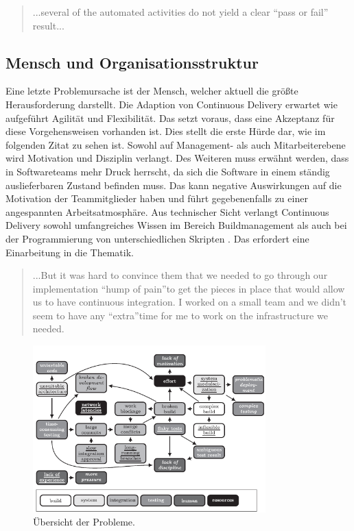 \begin{quote}\glqq ...several of the automated activities do not yield a clear “pass or fail” result... \grqq~\cite[S.65]{Laukkanen.2017}\end{quote}
%

\subsection{Mensch und Organisationsstruktur}
Eine letzte Problemursache ist der Mensch, welcher aktuell die größte Herausforderung darstellt. Die Adaption von Continuous Delivery erwartet wie aufgeführt Agilität und Flexibilität. Das setzt voraus, dass eine Akzeptanz für diese Vorgehensweisen vorhanden ist. Dies stellt die erste Hürde dar, wie im folgenden Zitat zu sehen ist. Sowohl auf Management- als auch Mitarbeiterebene wird Motivation und Disziplin verlangt. Des Weiteren muss erwähnt werden, dass in Softwareteams mehr Druck herrscht, da sich die Software in einem ständig auslieferbaren Zustand befinden muss. Das kann negative Auswirkungen auf die Motivation der Teammitglieder haben und führt gegebenenfalls zu einer angespannten Arbeitsatmosphäre. Aus technischer Sicht verlangt Continuous Delivery sowohl umfangreiches Wissen im Bereich Buildmanagement als auch bei der Programmierung von unterschiedlichen Skripten \cite{Laukkanen.2017}. Das erfordert eine Einarbeitung in die Thematik. 

\begin{quote}\glqq ...But it was hard to convince them that we needed to go through our implementation “hump of pain”to get the pieces in place that would allow us to have continuous integration. I worked on a small team and we didn’t seem to have any “extra”time for me to work on the infrastructure we needed. \grqq~\cite[S.373]{Stolberg.2009} \end{quote}
%

\begin{figure}[ht]
	\centering
	\includegraphics[width=0.8\textwidth,]{images/all}
	\caption{Übersicht der Probleme\cite{Laukkanen.2017}.}
	\label{integrationsprobleme}
\end{figure}
